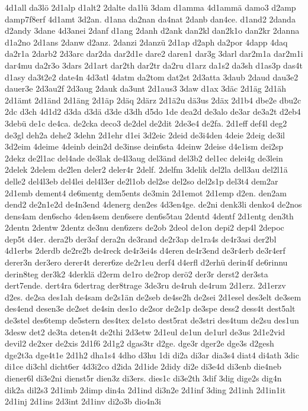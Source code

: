 {4d1all
da3lö
2d1alp
d1alt2
2dalte
da1lü
3dam
d1amma
4d1ammä
damo3
d2amp
damp7f8erf
4d1amt
3d2an.
d1ana
da2nan
da4nat
2danb
dan4ce.
d1and2
2danda
d2andy
3dane
4d3anei
2danf
d1ang
2danh
d2ank
dan2kl
dan2k1o
dan2kr
2danna
d1a2no
2d1ans
2danw
d2anz.
2danzi
2danzü
2d1ap
d2aph
da2por
4dapp
4daq
da2r1a
2darb2
2d3arc
dar2da
dar2d1e
dare2
daren1
dar3g
3darl
dar2m1a
dar2m1i
dar4mu
da2r3o
3dars
2d1art
dar2th
dar2tr
da2ru
d1arz
da1s2
da3sh
d1as3p
das4t
d1asy
da3t2e2
date4n
4d3atl
4datm
da2tom
dat2st
2d3atta
3daub
2daud
dau3e2
dauer3e
2d3au2f
2d3aug
2dauk
da3unt
2d1aus3
3daw
d1ax
3däc
2d1äg
2d1äh
2d1ämt
2d1änd
2d1äng
2d1äp
2däq
2därz
2d1ä2u
dä3us
2däx
2d1b4
dbe2e
dbu2c
2dc
d3ch
4d1d2
d3da
d3dä
d3de
d3dh
d5do
1de
dea2d
de3alo
de3ar
de3a2t
d2eb4
3debü
de1c
de4ca.
de2cka
deco3
de2del
de2dit
2de3e4
de2fa.
2d1eff
def4l
deg2
de3gl
deh2a
dehe2
3dehn
2d1ehr
d1ei
3d2eic
2deid
de3i4den
4deie
2deig
de3il
3d2eim
4deime
4deinb
dein2d
de3inse
dein6sta
4deinw
2deise
d4e1ism
dei2sp
2dekz
de2l1ac
del4ade
de3lak
de4l3aug
del3änd
del3b2
del1ec
delei4g
de3lein
2delek
2delem
de2len
deler2
deler4r
2delf.
2delfm
3delik
del2la
dell3au
del2l1ä
delle2
del4l3eb
del4lei
del4l3er
de2l1ob
del2se
del2so
del2s1p
del3t4
dem2ar
2d1emb
dement4
de6mentg
dem5ents
de3min
2d1emot
2d1emp
d2en.
den2am
dend2
de2n1e2d
de4n3end
4denerg
den2es
4d3en4ge.
de2ni
denk3li
denko4
de2nos
dens4am
den6scho
4den4sem
den6sere
den6s5tau
2dentd
4dentf
2d1entg
den3th
2dentn
2dentw
2dentz
de3nu
den6zers
de2ob
2deol
de1on
depi2
dep4l
2depoc
dep5t
d4er.
dera2b
der3af
dera2n
de3rand
de2r3ap
de1ra4s
de4r3asi
der2bl
4d1erbs
2derdb
de2re2b
de4reck
de4r3ei4s
d4eren
de4r3end
de3r4erb
de3r4erf
derer3n
der3ero
derer4t
derer6ze
de2r1eu
derf4
d4erfl
d2erhü
derin4f
de6rinnu
derin8teg
der3k2
4derklä
d2erm
de1ro
de2rop
derö2
der3r
derst2
der3sta
dert7ende.
dert4ra
6dertrag
der8trage
3de3ru
de4ruh
de4rum
2d1erz.
2d1erzv
d2es.
de2sa
des1ah
de4sam
de2s1än
de2seb
de4se2h
de2sei
2d1esel
des3elt
de3sem
des4end
desen3e
de2set
de4sin
des1o
de2sor
de2s1p
de3spe
dess2
dess4t
dest5alt
de3stel
des6temp
de5stern
des4tex
de1sto
dest5rat
de3stri
des4tum
de2su
des1un
3desw
det2
de3ta
deten4t
de2thi
2d3etw
2d1eul
de1un
de1url
de3us
2d1e2vid
devil2
de2xer
de2xis
2d1f6
2d1g2
dgas3tr
d2ge.
dge3r
dger2e
dge3s
d2gesh
dge2t3a
dge4t1e
2d1h2
dha1s4
4dho
d3hu
1di
di2a
di3ar
dia3s4
diat4
di4ath
3dic
di1ce
di3chl
dicht6er
4d3i2co
d2ida
2d1ide
2didy
di2e
di3e4d
di3enb
die4neb
diener6l
di3e2ni
dienst5r
dien3z
di3ers.
dies1c
di3e2th
3dif
3dig
dige2s
dig4n
dik2a
dil2s3
2d1imb
2dimp
din4a
2d1ind
di3n2e
2d1inf
3ding
2d1inh
2d1in1it
2d1inj
2d1ins
2d3int
2d1inv
di2o3b
dio4n3i
}
